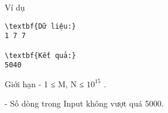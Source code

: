 Ví dụ
\begin{verbatim}
\textbf{Dữ liệu:}
1 7 7

\textbf{Kết quả:}
5040
\end{verbatim}
Giới hạn
- 1 ≤ M, N ≤ $10^{15}$   .   


   - Số dòng trong Input không vượt quá 5000.